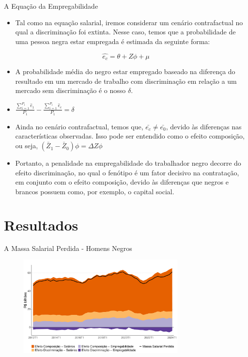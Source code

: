 \documentclass[10pt, xcolor=x11names,compress]{beamer}
\begin{document}
	\begin{frame}{A Equação da Empregabilidade}
		\begin{itemize}
			\item Tal como na equação salarial, iremos considerar um cenário contrafactual no qual a discriminação foi extinta. Nesse caso, temos que a probabilidade de uma pessoa negra estar empregada é estimada da seguinte forma:
		\end{itemize}
		\begin{equation}
				\hat{e_{c}} = \theta + Z\phi + \mu
		\end{equation}
		\begin{itemize}
			\item A probabilidade média do negro estar empregado baseado na diferença do resultado em um mercado de trabalho com discriminação em relação a um mercado sem discriminação é o nosso $\delta$.
			\item $ \frac{\sum_{i=1}^{P_{1}} \hat{e}_{1}}{P_{1}} - \frac{\sum_{i=1}^{P_{1}} \hat{e}_{c}}{P_{1}} = \delta$
			\item Ainda no cenário contrafactual, temos que, $\bar{e_{c}} \neq \bar{e_{0}}$, devido às diferenças nas características observadas. Isso pode ser entendido como o efeito composição, ou seja, $(\bar{Z}_{1} - \bar{Z}_{0})\phi = \Delta Z\phi$
			\item Portanto, a penalidade na empregabilidade do trabalhador negro decorre do efeito discriminação, no qual o fenótipo é um fator decisivo na contratação, em conjunto com o efeito composição, devido às diferenças que negros e brancos possuem como, por exemplo, o capital social.
		\end{itemize}
	\end{frame}
	
		\section{Resultados}
	\begin{frame}{A Massa Salarial Perdida - Homens Negros}
	\begin{figure}
		\centering
			\includegraphics[width = 0.75\textwidth]{figures_output/homem_negro_massa_perdida_gph.pdf}
	\end{figure}
	\end{frame}	
	
\end{document}
